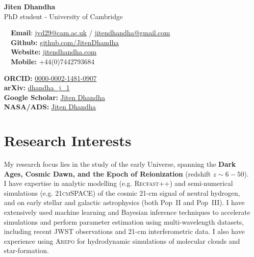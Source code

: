 \documentclass{article}
\begin{document}
\small %


\begin{center}
\huge
\textbf{Jiten Dhandha} \\
\normalsize
PhD student - University of Cambridge \\
\end{center}

\begin{minipage}[ht]{0.6\linewidth}
	\faEnvelope~~\textbf{Email}: \href{mailto:jvd29@cam.ac.uk}{jvd29@cam.ac.uk} / \href{mailto:jitendhandha@gmail.com}{jitendhandha@gmail.com} \\
	\faGithub~~\textbf{Github:} \href{https://github.com/JitenDhandha}{github.com/JitenDhandha}\\
	\faGlobe~~\textbf{Website:} \href{https://jitendhandha.com}{jitendhandha.com} \\
  \faPhone~~\textbf{Mobile:} +44(0)7442793684 \\
\end{minipage}
\begin{minipage}[ht]{0.34\linewidth}
	\begin{flushright}
    \textbf{ORCID:} \href{https://orcid.org/0000-0002-1481-0907}{0000-0002-1481-0907} \\
    \textbf{arXiv:} \href{https://arxiv.org/a/dhandha_j_1.html}{dhandha\_j\_1} \\
    \textbf{Google Scholar:} \href{https://scholar.google.com/citations?user=RjlmcA0AAAAJ}{Jiten Dhandha} \\
    \textbf{NASA/ADS:} \href{https://ui.adsabs.harvard.edu/search/?q=author%3A%22Dhandha%2C+Jiten%22}{Jiten Dhandha} \\
	\end{flushright}
\end{minipage}

\section*{Research Interests}

My research focus lies in the study of the early Universe, spanning the \textbf{Dark Ages, Cosmic Dawn, and the Epoch of Reionization} (redshift $z\sim 6 - 50$). I have expertise in analytic modelling (e.g. \textsc{Recfast++}) and semi-numerical simulations (e.g. \textsc{21cmSPACE}) of the cosmic 21-cm signal of neutral hydrogen, and on early stellar and galactic astrophysics (both Pop~II and Pop~III). I have extensively used machine learning and Bayesian inference techniques to accelerate simulations and perform parameter estimation using multi-wavelength datasets, including recent JWST observations and 21-cm interferometric data. I also have experience using \textsc{Arepo} for hydrodynamic simulations of molecular clouds and star-formation.
\end{document}
